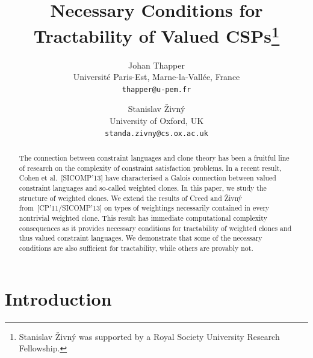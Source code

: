 \documentclass[11pt, reqno]{article}
\date{}
\theoremstyle{remark}
\begin{document}
\title{Necessary Conditions for Tractability of Valued CSPs\thanks{Stanislav \v{Z}ivn\'y was supported by a Royal Society University Research Fellowship.}}

\author{
Johan Thapper\\
Universit\'e Paris-Est, Marne-la-Vall\'ee, France\\
\texttt{thapper@u-pem.fr}
\and
Stanislav \v{Z}ivn\'{y}\\
University of Oxford, UK\\
\texttt{standa.zivny@cs.ox.ac.uk}
}


\maketitle


\begin{abstract}

The connection between constraint languages and clone theory has been a fruitful
line of research on the complexity of constraint satisfaction problems. In a
recent result, Cohen et al.~[SICOMP'13] have characterised a Galois connection
between valued constraint languages and so-called weighted clones. In this
paper, we study the structure of weighted clones. We extend the results of Creed
and \v{Z}ivn\'y from~[CP'11/SICOMP'13] on types of weightings necessarily
contained in every nontrivial weighted clone. This result has immediate
computational complexity consequences as it provides necessary conditions for
tractability of weighted clones and thus valued constraint languages. 
We demonstrate that some of the necessary conditions are
also sufficient for tractability, while others are provably not.

\end{abstract}

\section{Introduction}\label{sec:intro}
\end{document}

